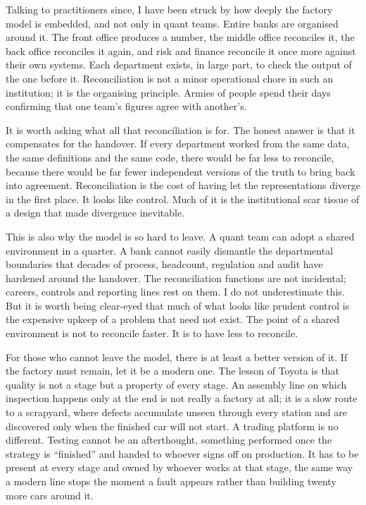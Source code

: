 \documentclass[
  11pt,
]{article}
\begin{document}
Talking to practitioners since, I have been struck by how deeply the
factory model is embedded, and not only in quant teams. Entire banks are
organised around it. The front office produces a number, the middle
office reconciles it, the back office reconciles it again, and risk and
finance reconcile it once more against their own systems. Each
department exists, in large part, to check the output of the one before
it. Reconciliation is not a minor operational chore in such an
institution; it is the organising principle. Armies of people spend
their days confirming that one team's figures agree with another's.

It is worth asking what all that reconciliation is for. The honest
answer is that it compensates for the handover. If every department
worked from the same data, the same definitions and the same code, there
would be far less to reconcile, because there would be far fewer
independent versions of the truth to bring back into agreement.
Reconciliation is the cost of having let the representations diverge in
the first place. It looks like control. Much of it is the institutional
scar tissue of a design that made divergence inevitable.

This is also why the model is so hard to leave. A quant team can adopt a
shared environment in a quarter. A bank cannot easily dismantle the
departmental boundaries that decades of process, headcount, regulation
and audit have hardened around the handover. The reconciliation
functions are not incidental; careers, controls and reporting lines rest
on them. I do not underestimate this. But it is worth being clear-eyed
that much of what looks like prudent control is the expensive upkeep of
a problem that need not exist. The point of a shared environment is not
to reconcile faster. It is to have less to reconcile.

For those who cannot leave the model, there is at least a better version
of it. If the factory must remain, let it be a modern one. The lesson of
Toyota is that quality is not a stage but a property of every stage. An
assembly line on which inspection happens only at the end is not really
a factory at all; it is a slow route to a scrapyard, where defects
accumulate unseen through every station and are discovered only when the
finished car will not start. A trading platform is no different. Testing
cannot be an afterthought, something performed once the strategy is
``finished'' and handed to whoever signs off on production. It has to be
present at every stage and owned by whoever works at that stage, the
same way a modern line stops the moment a fault appears rather than
building twenty more cars around it.
\end{document}
